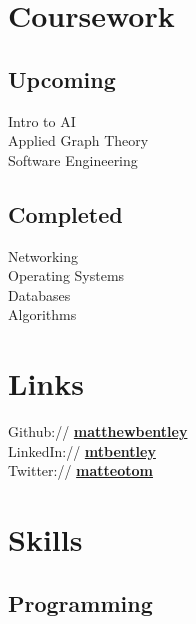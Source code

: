 \documentclass[letterpaper]{deedy-resume} %
\newcommand{\bul}{\textbullet{}}
\begin{document}
\begin{minipage}[t]{0.33\textwidth}
\section{Coursework}

\subsection{Upcoming}

Intro to AI \\%
Applied Graph Theory \\%
Software Engineering

\sectionspace %


\subsection{Completed}

Networking \\%
Operating Systems \\%
Databases \\%
Algorithms


\sectionspace %


\section{Links}

Github:// \href{https://github.com/matthewbentley}{\bf matthewbentley} \\
LinkedIn:// \href{https://www.linkedin.com/in/mtbentley}{\bf mtbentley} \\
Twitter:// \href{https://twitter.com/matteotom}{\bf matteotom} \\

\sectionspace %


\section{Skills}

\subsection{Programming}


\end{minipage}
\end{document}
